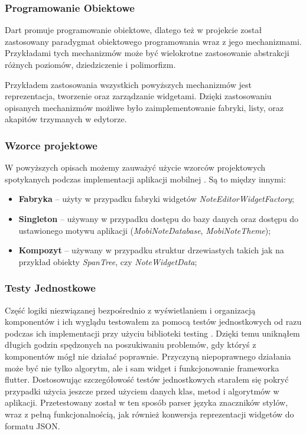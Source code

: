 \subsubsection{Programowanie Obiektowe}

Dart promuje programowanie obiektowe, dlatego też w projekcie został zastosowany paradygmat obiektowego programowania wraz z jego mechanizmami. Przykładami tych mechanizmów może być wielokrotne zastosowanie abstrakcji różnych poziomów, dziedziczenie i polimorfizm.

Przykładem zastosowania wszystkich powyższych mechanizmów jest reprezentacja, tworzenie oraz zarządzanie widgetami. 
Dzięki zastosowaniu opisanych mechanizmów możliwe było zaimplementowanie fabryki, listy, oraz akapitów trzymanych w edytorze.

\subsubsection{Wzorce projektowe}

W powyższych opisach możemy zauważyć użycie wzorców projektowych spotykanych podczas implementacji aplikacji mobilnej \cite{flutterdesignpatterns}. Są to między innymi:

\begin{itemize}
    \item \textbf{Fabryka} -- użyty w przypadku fabryki widgetów \textit{NoteEditorWidgetFactory};
    \item \textbf{Singleton} -- używany w przypadku dostępu do bazy danych oraz dostępu do ustawionego motywu aplikacji (\textit{MobiNoteDatabase}, \textit{MobiNoteTheme});
    \item \textbf{Kompozyt} -- używany w przypadku struktur drzewiastych takich jak na przykład obiekty \textit{SpanTree}, czy \textit{NoteWidgetData};
\end{itemize}

\subsubsection{Testy Jednostkowe}

Część logiki niezwiązanej bezpośrednio z wyświetlaniem i organizacją komponentów i ich wyglądu testowałem za pomocą testów jednostkowych od razu podczas ich implementacji przy użyciu biblioteki testing \cite{testing}. Dzięki temu uniknąłem długich godzin spędzonych na poszukiwaniu problemów, gdy któryś z komponentów mógł nie działać poprawnie. Przyczyną niepoprawnego działania może być nie tylko algorytm, ale i sam widget i funkcjonowanie frameworka flutter. Dostosowując szczegółowość testów jednostkowych starałem się pokryć przypadki użycia jeszcze przed użyciem danych klas, metod i algorytmów w aplikacji. Przetestowany został w ten sposób parser języka znaczników stylów, wraz z pełną funkcjonalnością, jak również konwersja reprezentacji widgetów do formatu JSON.


